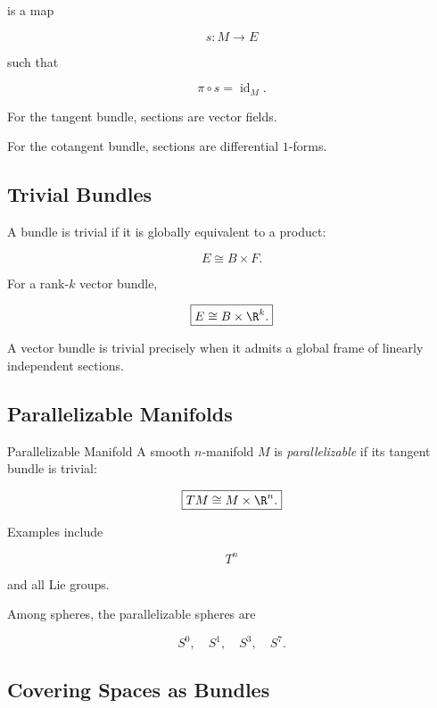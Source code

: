 is a map

\[
\boxed{
s:M\to E
}
\]

such that

\[
\boxed{
\pi\circ s=\operatorname{id}_M.
}
\]

For the tangent bundle, sections are vector fields.

For the cotangent bundle, sections are differential \(1\)-forms.

\subsection{Trivial Bundles}
\label{subsec:trivial-bundles}

A bundle is trivial if it is globally equivalent to a product:

\[
\boxed{
E\cong B\times F.
}
\]

For a rank-\(k\) vector bundle,

\[
\boxed{
E\cong B\times\R^k.
}
\]

A vector bundle is trivial precisely when it admits a global frame of
linearly independent sections.

\subsection{Parallelizable Manifolds}
\label{subsec:parallelizable-manifolds}

\begin{definitionbox}{Parallelizable Manifold}
A smooth \(n\)-manifold \(M\) is \emph{parallelizable} if its tangent bundle
is trivial:

\[
\boxed{
TM\cong M\times\R^n.
}
\]
\end{definitionbox}

Examples include

\[
\boxed{
T^n
}
\]

and all Lie groups.

Among spheres, the parallelizable spheres are

\[
\boxed{
S^0,\quad S^1,\quad S^3,\quad S^7.
}
\]

\subsection{Covering Spaces as Bundles}
\label{subsec:covering-spaces-bundles}

